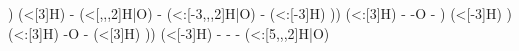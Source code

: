 \begin{struct}
{                                                                                                        )
                                                                                                            (<[3]H)
                                                                                                        -
                                                                                                            (<[,,,2]H|O)
                                                                                                        -
                                                                                                            (<:[-3,,,2]H|O)
                                                                                                        -
                                                                                                            (<:[-3]H)
                                                                                                    ))
                                                                                                        (<:[3]H)
                                                                                                    -
                                                                                                    -O
                                                                                                    -
                                                                                                )
                                                                                                    (<[-3]H)
                                                                                            )
                                                                                            (<:[3]H)
                                                                                        -O
                                                                                        -
                                                                                            (<[3]H)
                                                                                    ))
                                                                                        (<[-3]H)
                                                                                    -
                                                                                    -
                                                                                    -
                                                                                        (<:[5,,,2]H|O)
}
\end{struct}
